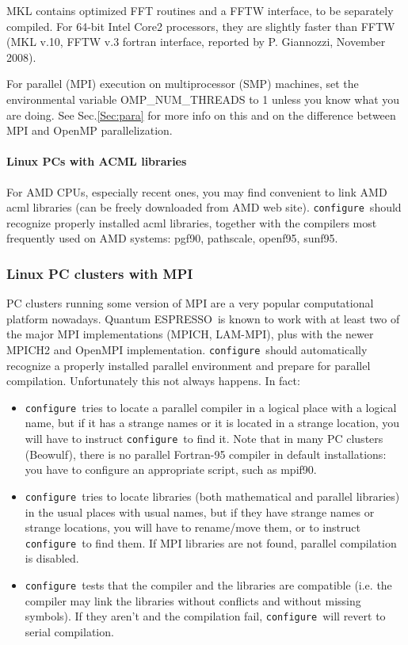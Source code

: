 \documentclass[12pt,a4paper]{article}
\def\qe{{\sc Quantum ESPRESSO}}
\def\configure{\texttt{configure}}
\begin{document}
MKL contains optimized FFT routines and a FFTW interface, to be separately
compiled. For 64-bit Intel Core2 processors, they are slightly faster than 
FFTW (MKL v.10, FFTW v.3 fortran interface, reported by P. Giannozzi,
November 2008). 

For parallel (MPI) execution on multiprocessor (SMP) machines, set the
environmental variable OMP\_NUM\_THREADS to 1 unless you know what you 
are doing. See Sec.\ref{Sec:para} for more info on this
and on the difference between MPI and OpenMP parallelization. 

\paragraph{Linux PCs with ACML libraries}
For AMD CPUs, especially recent ones, you may find convenient to 
link AMD acml libraries (can be freely downloaded from AMD web site). 
\configure\ should recognize properly installed acml libraries,
together with the compilers most frequently used on AMD systems:
pgf90, pathscale, openf95, sunf95.

\subsubsection{Linux PC clusters with MPI}
\label{SubSec:LinuxPCMPI}
PC clusters running some version of MPI are a very popular
computational platform nowadays. \qe\ is known to work
with at least two of the major MPI implementations (MPICH, LAM-MPI),
plus with the newer MPICH2 and OpenMPI implementation. 
\configure\ should automatically recognize a properly installed
parallel environment and prepare for parallel compilation. 
Unfortunately this not always happens. In fact:
\begin{itemize}
\item \configure\ tries to locate a parallel compiler in a logical
  place with a logical name,  but if it has a strange names or it is
  located  in a strange location, you will have to instruct \configure\ 
  to find it. Note that in many PC clusters (Beowulf), there is no
  parallel Fortran-95 compiler in default installations:  you have to
  configure an appropriate script, such as mpif90. 
\item \configure\ tries to locate libraries (both mathematical and
  parallel libraries) in the usual places with usual names, but if
  they have strange names or strange locations, you will have to
  rename/move them, or to instruct \configure\ to find them. If MPI
  libraries are not found,
  parallel compilation is disabled. 
\item \configure\ tests that the compiler and the libraries are
  compatible (i.e. the compiler may link the libraries without
  conflicts and without missing symbols). If they aren't and the
  compilation fail, \configure\ will revert to serial compilation. 
\end{itemize}
\end{document}
